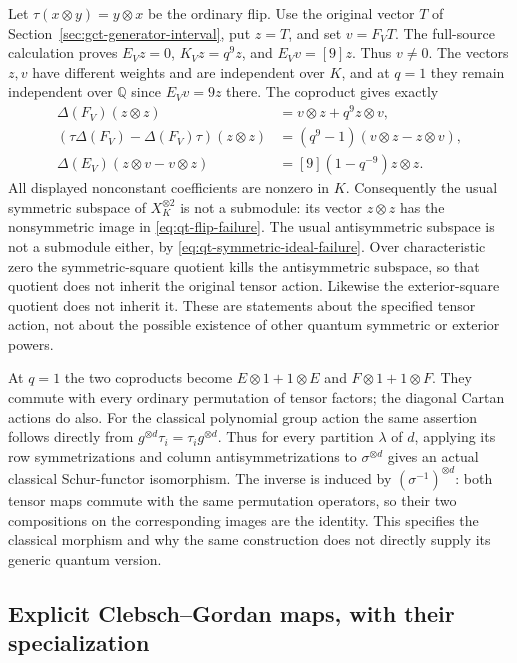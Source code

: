 Let $\tau(x\otimes y)=y\otimes x$ be the ordinary flip. Use the
original vector $T$ of Section~\ref{sec:gct-generator-interval}, put
$z=T$, and set $v=F_VT$. The full-source calculation proves
$E_Vz=0$, $K_Vz=q^9z$, and $E_Vv=[9]z$. Thus $v\ne0$.
The vectors $z,v$ have different weights and are independent over
$K$, and at $q=1$ they remain independent over $\mathbb Q$ since
$E_Vv=9z$ there. The coproduct gives exactly
\begin{align}
 \Delta(F_V)(z\otimes z)&=v\otimes z+q^9z\otimes v,\label{eq:qt-flip-failure}\\
 (\tau\Delta(F_V)-\Delta(F_V)\tau)(z\otimes z)
   &=(q^9-1)(v\otimes z-z\otimes v),\nonumber\\
 \Delta(E_V)(z\otimes v-v\otimes z)
   &=[9](1-q^{-9})z\otimes z.\label{eq:qt-symmetric-ideal-failure}
\end{align}
All displayed nonconstant coefficients are nonzero in $K$.
Consequently the usual symmetric subspace of $X_K^{\otimes2}$
is not a submodule: its vector $z\otimes z$ has the nonsymmetric
image in \eqref{eq:qt-flip-failure}. The usual antisymmetric
subspace is not a submodule either, by
\eqref{eq:qt-symmetric-ideal-failure}. Over characteristic zero
the symmetric-square quotient kills the antisymmetric subspace,
so that quotient does not inherit the original tensor action.
Likewise the exterior-square quotient does not inherit it.
These are statements about the specified tensor action, not about
the possible existence of other quantum symmetric or exterior powers.

At $q=1$ the two coproducts become
$E\otimes1+1\otimes E$ and $F\otimes1+1\otimes F$.
They commute with every ordinary permutation of tensor factors;
the diagonal Cartan actions do also. For the classical polynomial
group action the same assertion follows directly from
$g^{\otimes d}\tau_i=\tau_i g^{\otimes d}$.
Thus for every partition $\lambda$ of $d$, applying its row
symmetrizations and column antisymmetrizations to
$\sigma^{\otimes d}$ gives an actual classical Schur-functor
isomorphism. The inverse is induced by $(\sigma^{-1})^{\otimes d}$:
both tensor maps commute with the same permutation operators,
so their two compositions on the corresponding images are the identity.
This specifies the classical morphism and why the same construction
does not directly supply its generic quantum version.

\subsection{Explicit Clebsch--Gordan maps, with their specialization}

